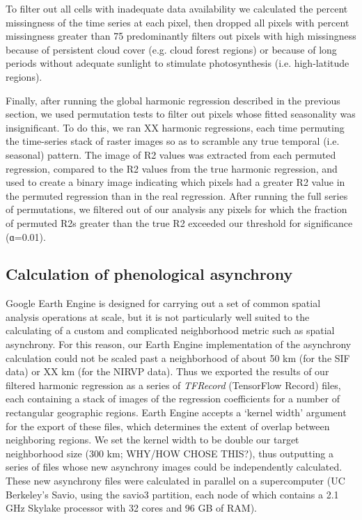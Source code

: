 \documentclass[9pt,twocolumn,twoside,lineno]{pnas-new}
\begin{document}
{To filter out all cells with inadequate data availability we calculated
the percent missingness of the time series at each pixel, then dropped
all pixels with percent missingness greater than 75%
predominantly filters out pixels with high missingness because of
persistent cloud cover (e.g. cloud forest regions) or because of long
periods without adequate sunlight to stimulate photosynthesis (i.e.
high-latitude regions).

Finally, after running the global harmonic regression described in the
previous section, we used permutation tests to filter out pixels whose
fitted seasonality was insignificant. To do this, we ran XX harmonic
regressions, each time permuting the time-series stack of raster images
so as to scramble any true temporal (i.e. seasonal) pattern. The image of
R2 values was extracted from each permuted regression, compared to the R2
values from the true harmonic regression, and used to create a binary
image indicating which pixels had a greater R2 value in the permuted
regression than in the real regression. After running the full series of
permutations, we filtered out of our analysis any pixels for which the
fraction of permuted R2s greater than the true R2 exceeded our threshold
for significance (ɑ=0.01).

\subsection*{Calculation of phenological asynchrony}
Google Earth Engine is designed for carrying out a set of common spatial
analysis operations at scale, but it is not particularly well suited to
the calculating of a custom and complicated neighborhood metric such as
spatial asynchrony. For this reason, our Earth Engine implementation of
the asynchrony calculation could not be scaled past a neighborhood of
about 50 km (for the SIF data) or XX km (for the NIRVP data). Thus we
exported the results of our filtered harmonic regression as a series of
\textit{TFRecord} (TensorFlow Record) files, each containing a stack of images of
the regression coefficients for a number of rectangular geographic
regions. Earth Engine accepts a ‘kernel width’ argument for the export of
these files, which determines the extent of overlap between neighboring
regions. We set the kernel width to be double our target neighborhood
size (300 km; WHY/HOW CHOSE THIS?), thus outputting a series of files
whose new asynchrony images could be independently calculated. These new
asynchrony files were calculated in parallel on a supercomputer (UC
Berkeley’s Savio, using the savio3 partition, each node of which contains
a 2.1 GHz Skylake processor with 32 cores and 96 GB of RAM).

}
\end{document}
